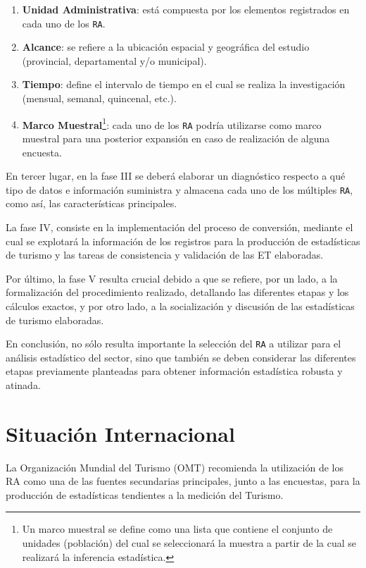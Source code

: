 \documentclass[
]{book}
\begin{document}
\begin{enumerate}
\def\labelenumi{\Roman{enumi})}
\item
  \textbf{Unidad Administrativa}: está compuesta por los elementos registrados en cada uno de los \texttt{RA}.
\item
  \textbf{Alcance}: se refiere a la ubicación espacial y geográfica del estudio (provincial, departamental y/o municipal).
\item
  \textbf{Tiempo}: define el intervalo de tiempo en el cual se realiza la investigación (mensual, semanal, quincenal, etc.).
\item
  \textbf{Marco Muestral}\footnote{Un marco muestral se define como una lista que contiene el conjunto de unidades (población) del cual se seleccionará la muestra a partir de la cual se realizará la inferencia estadística.}: cada uno de los \texttt{RA} podría utilizarse como marco muestral para una posterior expansión en caso de realización de alguna encuesta.
\end{enumerate}

En tercer lugar, en la fase III se deberá elaborar un diagnóstico respecto a qué tipo de datos e información suministra y almacena cada uno de los múltiples \texttt{RA}, como así, las características principales.

La fase IV, consiste en la implementación del proceso de conversión, mediante el cual se explotará la información de los registros para la producción de estadísticas de turismo y las tareas de consistencia y validación de las ET elaboradas.

Por último, la fase V resulta crucial debido a que se refiere, por un lado, a la formalización del procedimiento realizado, detallando las diferentes etapas y los cálculos exactos, y por otro lado, a la socialización y discusión de las estadísticas de turismo elaboradas.

En conclusión, no sólo resulta importante la selección del \texttt{RA} a utilizar para el análisis estadístico del sector, sino que también se deben considerar las diferentes etapas previamente planteadas para obtener información estadística robusta y atinada.

\hypertarget{situaciuxf3n-internacional}{%
\section{Situación Internacional}\label{situaciuxf3n-internacional}}

La Organización Mundial del Turismo (OMT) recomienda la utilización de los RA como una de las fuentes secundarias principales, junto a las encuestas, para la producción de estadísticas tendientes a la medición del Turismo.
\end{document}
